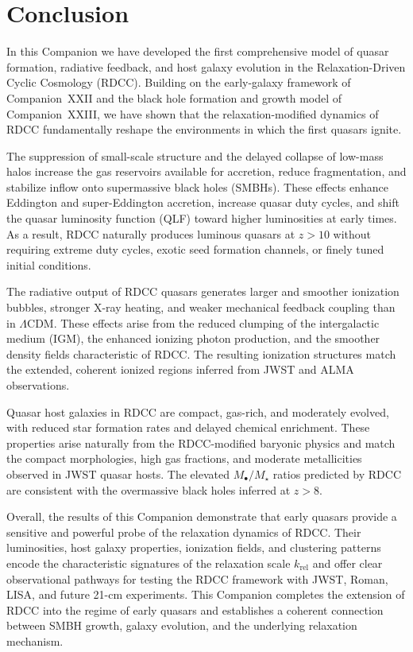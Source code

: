 \documentclass[11pt,a4paper]{article}
\begin{document}
\section{Conclusion}

In this Companion we have developed the first comprehensive model of quasar formation,
radiative feedback, and host galaxy evolution in the Relaxation-Driven Cyclic Cosmology
(RDCC). Building on the early-galaxy framework of Companion~XXII and the black hole
formation and growth model of Companion~XXIII, we have shown that the relaxation-modified
dynamics of RDCC fundamentally reshape the environments in which the first quasars ignite.

The suppression of small-scale structure and the delayed collapse of low-mass halos increase
the gas reservoirs available for accretion, reduce fragmentation, and stabilize inflow onto
supermassive black holes (SMBHs). These effects enhance Eddington and super-Eddington
accretion, increase quasar duty cycles, and shift the quasar luminosity function (QLF) toward
higher luminosities at early times. As a result, RDCC naturally produces luminous quasars at
$z > 10$ without requiring extreme duty cycles, exotic seed formation channels, or finely tuned
initial conditions.

The radiative output of RDCC quasars generates larger and smoother ionization bubbles,
stronger X-ray heating, and weaker mechanical feedback coupling than in $\Lambda$CDM.
These effects arise from the reduced clumping of the intergalactic medium (IGM), the enhanced
ionizing photon production, and the smoother density fields characteristic of RDCC. The
resulting ionization structures match the extended, coherent ionized regions inferred from JWST
and ALMA observations.

Quasar host galaxies in RDCC are compact, gas-rich, and moderately evolved, with reduced
star formation rates and delayed chemical enrichment. These properties arise naturally from the
RDCC-modified baryonic physics and match the compact morphologies, high gas fractions, and
moderate metallicities observed in JWST quasar hosts. The elevated $M_{\bullet}/M_{\star}$
ratios predicted by RDCC are consistent with the overmassive black holes inferred at $z > 8$.

Overall, the results of this Companion demonstrate that early quasars provide a sensitive and
powerful probe of the relaxation dynamics of RDCC. Their luminosities, host galaxy properties,
ionization fields, and clustering patterns encode the characteristic signatures of the relaxation
scale $k_{\mathrm{rel}}$ and offer clear observational pathways for testing the RDCC framework
with JWST, Roman, LISA, and future 21-cm experiments. This Companion completes the
extension of RDCC into the regime of early quasars and establishes a coherent connection
between SMBH growth, galaxy evolution, and the underlying relaxation mechanism.
\end{document}

